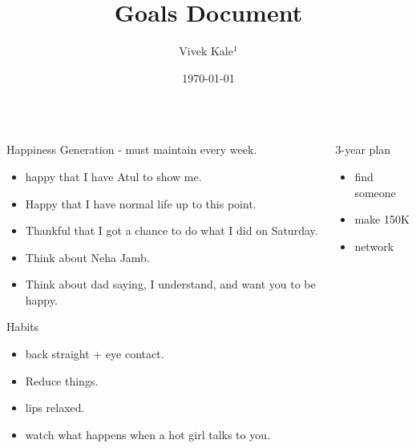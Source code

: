 \documentclass[serif, mathserif, final]{beamer}
\title{Goals Document}
\author{Vivek Kale$^1$}
\institute{$^1$ University of Illinois at Urbana-Champaign}
\date{\today}
\begin{document}
 

\begin{frame}{} 
  \begin{columns}
    \begin{column}{0.22\linewidth}
      \begin{block}{Happiness Generation - must maintain every week.}                                          
        \begin{itemize}
          \tiny \item \tiny happy that I have Atul to show me.  
        \item \tiny Happy that I have normal life up to this point.  
        \item \tiny Thankful that I got a chance to do what I did on Saturday. 
        \item \tiny Think about Neha Jamb. 
        \item \tiny Think about dad saying, I understand, and want you to be happy. 
        \end{itemize}
      \end{block} 


    \begin{block}{Habits} 
      \begin{itemize} 
        \tiny \item \tiny back straight + eye contact. 
      \item \tiny Reduce things. 
      \item \tiny lips relaxed. 
      \item \tiny watch what happens when a hot girl talks to you. 
      \end{itemize} 
    \end{block} 
  \end{column} %

  \begin{column}{0.5\linewidth}
    \begin{block}{ 3-year plan }
      \begin{itemize}
      \item \small find someone
      \item \small make 150K
      \item \small network
      \end{itemize}
    \end{block}
    

\end{column}
\end{columns}
\end{frame}
\end{document}
